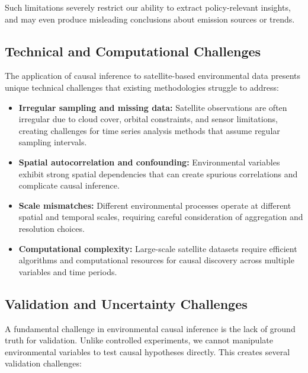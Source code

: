 Such limitations severely restrict our ability to extract policy-relevant insights, and may even produce misleading conclusions about emission sources or trends.

\subsection{Technical and Computational Challenges}

The application of causal inference to satellite-based environmental data presents unique technical challenges that existing methodologies struggle to address:

\begin{itemize}
	\item \textbf{Irregular sampling and missing data:} Satellite observations are often irregular due to cloud cover, orbital constraints, and sensor limitations, creating challenges for time series analysis methods that assume regular sampling intervals.

	\item \textbf{Spatial autocorrelation and confounding:} Environmental variables exhibit strong spatial dependencies that can create spurious correlations and complicate causal inference.

	\item \textbf{Scale mismatches:} Different environmental processes operate at different spatial and temporal scales, requiring careful consideration of aggregation and resolution choices.

	\item \textbf{Computational complexity:} Large-scale satellite datasets require efficient algorithms and computational resources for causal discovery across multiple variables and time periods.
\end{itemize}

\subsection{Validation and Uncertainty Challenges}

A fundamental challenge in environmental causal inference is the lack of ground truth for validation. Unlike controlled experiments, we cannot manipulate environmental variables to test causal hypotheses directly. This creates several validation challenges:


